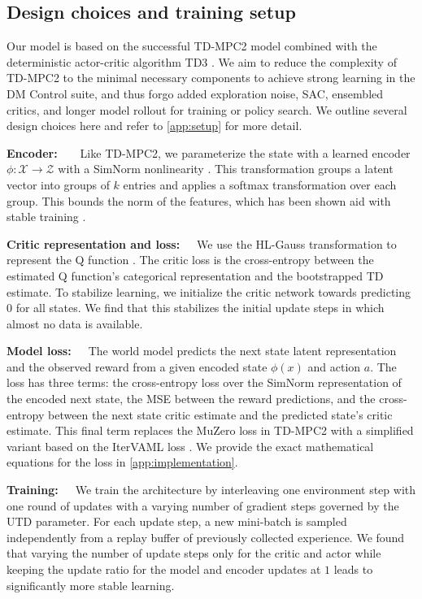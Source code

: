 \subsection{Design choices and training setup}
\label{sec:mad:method}

Our model is based on the successful TD-MPC2 model \parencite{hansen2024tdmpc} combined with the deterministic actor-critic algorithm TD3 \parencite{fujimoto2018addressing}.
We aim to reduce the complexity of TD-MPC2 to the minimal necessary components to achieve strong learning in the DM Control suite, and thus forgo added exploration noise, SAC, ensembled critics, and longer model rollout for training or policy search. We outline several design choices here and refer to \autoref{app:setup} for more detail.

\textbf{Encoder:}~~~~Like TD-MPC2, we parameterize the state with a learned encoder $\phi: \mathcal{X} \rightarrow \mathcal{Z}$ with a SimNorm nonlinearity \parencite{lavoie2023simplicial}. 
This transformation groups a latent vector into groups of $k$ entries and applies a softmax transformation over each group.
This bounds the norm of the features, which has been shown aid with stable training \parencite{hussing2024dissecting,nauman2024overestimation}.

\textbf{Critic representation and loss:}~~~We use the HL-Gauss transformation to represent the Q function \parencite{farebrother2024stop}. The critic loss is the cross-entropy between the estimated Q function's categorical representation and the bootstrapped TD estimate.
To stabilize learning, we initialize the critic network towards predicting $0$ for all states.
We find that this stabilizes the initial update steps in which almost no data is available.

\textbf{Model loss:}~~~The world model predicts the next state latent representation and the observed reward from a given encoded state $\phi(x)$ and action $a$. The loss has three terms: the cross-entropy loss over the SimNorm representation of the encoded next state, the MSE between the reward predictions, and the cross-entropy between the next state critic estimate and the predicted state's critic estimate.
This final term replaces the MuZero loss in TD-MPC2 with a simplified variant based on the IterVAML loss \parencite{itervaml}.
We provide the exact mathematical equations for the loss in \autoref{app:implementation}.


\textbf{Training:}~~~We train the architecture by interleaving one environment step with one round of updates with a varying number of gradient steps governed by the UTD parameter.
For each update step, a new mini-batch is sampled independently from a replay buffer of previously collected experience.
We found that varying the number of update steps only for the critic and actor while keeping the update ratio for the model and encoder updates at $1$ leads to significantly more stable learning.

